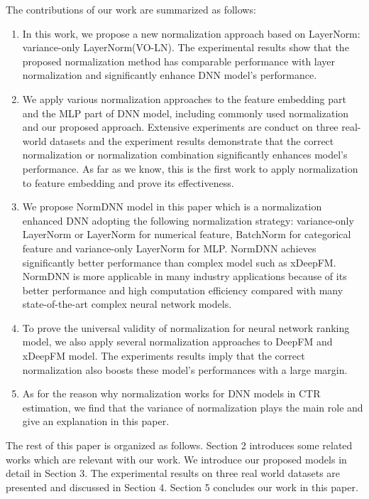 \documentclass[sigconf]{acmart}
\begin{document}
The contributions of our work are summarized as follows:
\begin{enumerate}

    \item	In this work, we propose a new normalization approach based on LayerNorm: variance-only LayerNorm(VO-LN). The experimental results show that the proposed normalization method has comparable performance with layer normalization and significantly enhance DNN model's performance.

    \item We apply various normalization approaches to the feature embedding part and the MLP part of DNN model, including commonly used normalization and our proposed approach. Extensive experiments are conduct on three real-world datasets and the experiment results demonstrate that the correct normalization or normalization combination significantly enhances model's performance. As far as we know, this is the first work to apply normalization to feature embedding and prove its effectiveness.

    \item We propose NormDNN model in this paper which is a normalization enhanced DNN adopting the following normalization strategy: variance-only LayerNorm or LayerNorm for numerical feature, BatchNorm for categorical feature and variance-only LayerNorm for MLP. NormDNN achieves significantly better performance than complex model such as xDeepFM. NormDNN is more applicable in many  industry applications because of its better performance and high computation efficiency compared with many state-of-the-art complex neural network models.

    \item To prove the universal validity of normalization for neural network ranking model, we also apply several normalization approaches to DeepFM and xDeepFM model. The experiments results imply that the correct normalization also boosts these model's performances with a large margin.

    \item As for the reason why normalization works for DNN models in CTR estimation, we find that the variance of normalization plays the main role and give an explanation in this paper.
\end{enumerate}

The rest of this paper is organized as follows. Section 2 introduces some related works which are relevant with our work. We introduce our proposed models in detail in Section 3. The experimental results on three real world datasets are presented and discussed in Section 4. Section 5 concludes our work in this paper.
\end{document}
